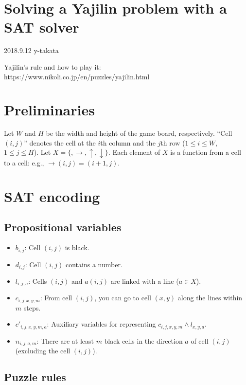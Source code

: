 \documentclass[a4paper]{article}
\newcommand{\R}{{\rightarrow}}
\newcommand{\U}{{\uparrow}}
\newcommand{\D}{{\downarrow}}
\begin{document}
\section*{Solving a Yajilin problem with a SAT solver}
\begin{flushright}
2018.9.12 y-takata
\end{flushright}

Yajilin's rule and how to play it: \\
https://www.nikoli.co.jp/en/puzzles/yajilin.html

\section{Preliminaries}
Let $W$ and $H$ be the width and height of the game board, respectively.
``Cell $(i,j)$'' denotes the cell at the $i$th column and the $j$th row
($1\le i\le W$, $1\le j\le H$).
%
Let $X=\{,\R,\U,\D\}$.
Each element of $X$ is a function from a cell to a cell:
e.g., $\R(i,j)=(i+1,j)$.

\section{SAT encoding}
\subsection{Propositional variables}
\begin{itemize}
\item $b_{i,j}$: Cell $(i,j)$ is black.
\item $d_{i,j}$: Cell $(i,j)$ contains a number.
\item $l_{i,j,a}$:
  Cells $(i,j)$ and $a(i,j)$ are linked with a line ($a\in X$).
\item $c_{i,j,x,y,m}$:
  From cell $(i,j)$, you can go to cell $(x,y)$ along the lines
  within $m$ steps.
\item $c'_{i,j,x,y,m,a}$:
  Auxiliary variables for representing $c_{i,j,x,y,m}\land l_{x,y,a}$.
\item $n_{i,j,a,m}$:
  There are at least $m$ black cells in the direction $a$ of
  cell $(i,j)$ (excluding the cell $(i,j)$).
\end{itemize}

\subsection{Puzzle rules}
\end{document}

